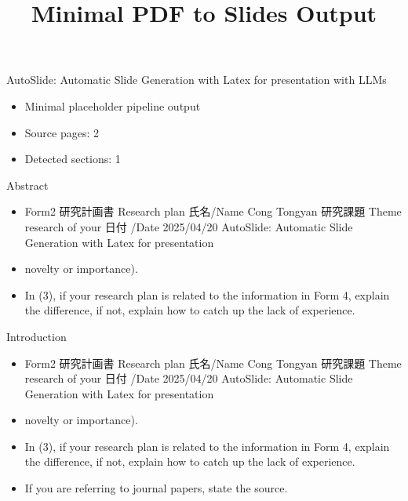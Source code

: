 \documentclass{beamer}
\title{Minimal PDF to Slides Output}
\begin{document}
\frame{\titlepage}
\begin{frame}{AutoSlide: Automatic Slide Generation with Latex for presentation with LLMs}
  \begin{itemize}
    \item Minimal placeholder pipeline output
    \item Source pages: 2
    \item Detected sections: 1
  \end{itemize}
\end{frame}
\begin{frame}{Abstract}
  \begin{itemize}
    \item Form2 研究計画書 Research plan 氏名/Name Cong Tongyan 研究課題 Theme research of your 日付 /Date 2025/04/20 AutoSlide: Automatic Slide Generation with Latex for presentation
    \item novelty or importance).
    \item In (3), if your research plan is related to the information in Form 4, explain the difference, if not, explain how to catch up the lack of experience.
  \end{itemize}
\end{frame}
\begin{frame}{Introduction}
  \begin{itemize}
    \item Form2 研究計画書 Research plan 氏名/Name Cong Tongyan 研究課題 Theme research of your 日付 /Date 2025/04/20 AutoSlide: Automatic Slide Generation with Latex for presentation
    \item novelty or importance).
    \item In (3), if your research plan is related to the information in Form 4, explain the difference, if not, explain how to catch up the lack of experience.
    \item If you are referring to journal papers, state the source.
  \end{itemize}
\end{frame}
\end{document}
